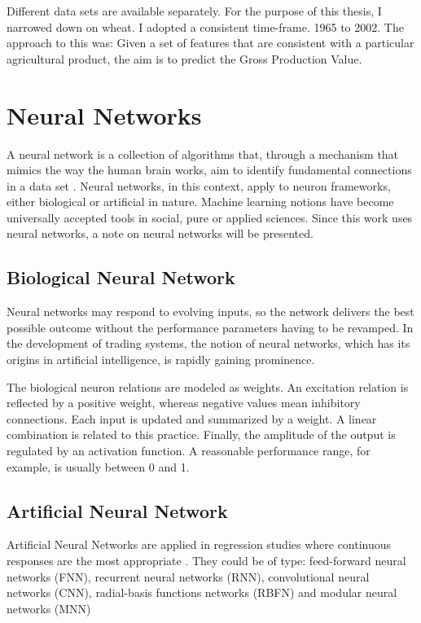 Different data sets are available separately. For the purpose of this thesis, I narrowed down on wheat. I adopted a consistent time-frame. 1965 to 2002. The approach to this was: Given a set of features that are consistent with a particular agricultural product, the aim is to predict the Gross Production Value.

\section{Neural Networks}
A neural network is a collection of algorithms that, through a mechanism that mimics the way the human brain works, aim to identify fundamental connections in a data set \cite{jain1999recurrent}.  Neural networks, in this context, apply to neuron frameworks, either biological or artificial in nature. Machine learning notions have become universally accepted tools in social, pure or applied sciences. Since this work uses neural networks, a note on neural networks will be presented.

\subsection{Biological Neural Network}
Neural networks may respond to evolving inputs, so the network delivers the best possible outcome without the performance parameters having to be revamped. In the development of trading systems, the notion of neural networks, which has its origins in artificial intelligence, is rapidly gaining prominence\cite{krose1993introduction}.


The biological neuron relations are modeled as weights. An excitation relation is reflected by a positive weight, whereas negative values mean inhibitory connections. Each input is updated and summarized by a weight. A linear combination is related to this practice. Finally, the amplitude of the output is regulated by an activation function. A reasonable performance range, for example, is usually between 0 and 1.

\subsection{Artificial Neural Network}

Artificial Neural Networks are applied in regression studies where continuous responses are the most appropriate \cite{haykin2009neural}. They could be of type: feed-forward neural networks (FNN), recurrent neural networks (RNN), convolutional neural networks (CNN), radial-basis functions networks (RBFN) and modular neural networks (MNN) \cite{nielsen2015neural,goyal2013artificial,grossberg2013recurrent,ripley2007pattern}

